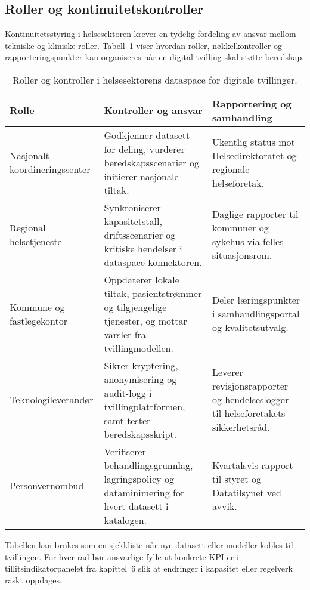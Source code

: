 \subsection{Roller og kontinuitetskontroller}
Kontinuitetsstyring i helsesektoren krever en tydelig fordeling av ansvar mellom tekniske og kliniske roller. Tabell~\ref{tab:kap03-helse-dataspace}
viser hvordan roller, nøkkelkontroller og rapporteringspunkter kan organiseres når en digital tvilling skal støtte beredskap.

\begin{table}[ht]
    \centering
    \caption{Roller og kontroller i helsesektorens dataspace for digitale tvillinger.}
    \label{tab:kap03-helse-dataspace}
    \begin{tabular}{p{}p{}p{}}
        \toprule
        \textbf{Rolle} & \textbf{Kontroller og ansvar} & \textbf{Rapportering og samhandling} \\
        \midrule
        Nasjonalt koordineringssenter & Godkjenner datasett for deling, vurderer beredskapsscenarier og initierer nasjonale tiltak. & Ukentlig status mot Helsedirektoratet og regionale helseforetak. \\
        Regional helsetjeneste & Synkroniserer kapasitetstall, driftsscenarier og kritiske hendelser i dataspace-konnektoren. & Daglige rapporter til kommuner og sykehus via felles situasjonsrom. \\
        Kommune og fastlegekontor & Oppdaterer lokale tiltak, pasientstrømmer og tilgjengelige tjenester, og mottar varsler fra tvillingmodellen. & Deler læringspunkter i samhandlingsportal og kvalitetsutvalg. \\
        Teknologileverandør & Sikrer kryptering, anonymisering og audit-logg i tvillingplattformen, samt tester beredskapsskript. & Leverer revisjonsrapporter og hendelseslogger til helseforetakets sikkerhetsråd. \\
        Personvernombud & Verifiserer behandlingsgrunnlag, lagringspolicy og dataminimering for hvert datasett i katalogen. & Kvartalsvis rapport til styret og Datatilsynet ved avvik. \\
        \bottomrule
    \end{tabular}
\end{table}

Tabellen kan brukes som en sjekkliste når nye datasett eller modeller kobles til tvillingen. For hver rad bør ansvarlige fylle ut
konkrete KPI-er i tillitsindikatorpanelet fra kapittel~6 slik at endringer i kapasitet eller regelverk raskt oppdages.

